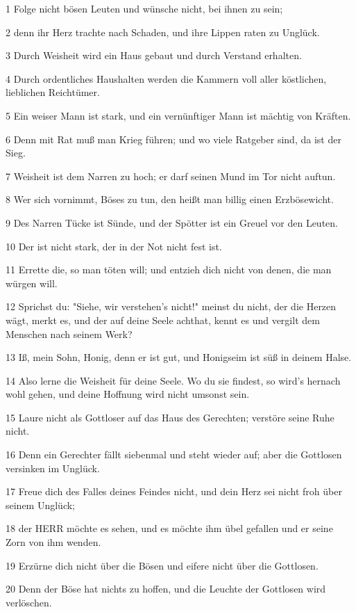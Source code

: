 \par 1 Folge nicht bösen Leuten und wünsche nicht, bei ihnen zu sein;
\par 2 denn ihr Herz trachte nach Schaden, und ihre Lippen raten zu Unglück.
\par 3 Durch Weisheit wird ein Haus gebaut und durch Verstand erhalten.
\par 4 Durch ordentliches Haushalten werden die Kammern voll aller köstlichen, lieblichen Reichtümer.
\par 5 Ein weiser Mann ist stark, und ein vernünftiger Mann ist mächtig von Kräften.
\par 6 Denn mit Rat muß man Krieg führen; und wo viele Ratgeber sind, da ist der Sieg.
\par 7 Weisheit ist dem Narren zu hoch; er darf seinen Mund im Tor nicht auftun.
\par 8 Wer sich vornimmt, Böses zu tun, den heißt man billig einen Erzbösewicht.
\par 9 Des Narren Tücke ist Sünde, und der Spötter ist ein Greuel vor den Leuten.
\par 10 Der ist nicht stark, der in der Not nicht fest ist.
\par 11 Errette die, so man töten will; und entzieh dich nicht von denen, die man würgen will.
\par 12 Sprichst du: "Siehe, wir verstehen's nicht!" meinst du nicht, der die Herzen wägt, merkt es, und der auf deine Seele achthat, kennt es und vergilt dem Menschen nach seinem Werk?
\par 13 Iß, mein Sohn, Honig, denn er ist gut, und Honigseim ist süß in deinem Halse.
\par 14 Also lerne die Weisheit für deine Seele. Wo du sie findest, so wird's hernach wohl gehen, und deine Hoffnung wird nicht umsonst sein.
\par 15 Laure nicht als Gottloser auf das Haus des Gerechten; verstöre seine Ruhe nicht.
\par 16 Denn ein Gerechter fällt siebenmal und steht wieder auf; aber die Gottlosen versinken im Unglück.
\par 17 Freue dich des Falles deines Feindes nicht, und dein Herz sei nicht froh über seinem Unglück;
\par 18 der HERR möchte es sehen, und es möchte ihm übel gefallen und er seine Zorn von ihm wenden.
\par 19 Erzürne dich nicht über die Bösen und eifere nicht über die Gottlosen.
\par 20 Denn der Böse hat nichts zu hoffen, und die Leuchte der Gottlosen wird verlöschen.
